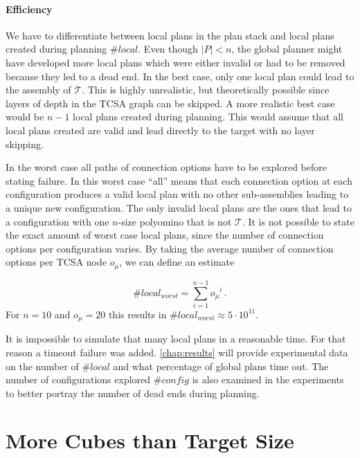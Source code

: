 \paragraph{Efficiency}

We have to differentiate between local plans in the plan stack and local plans created during planning $\#\textit{local}$.
Even though $|P| < n$, the global planner might have developed more local plans which were either invalid or had to be removed because they led to a dead end.
In the best case, only one local plan could lead to the assembly of $\mathcal{T}$.
This is highly unrealistic, but theoretically possible since layers of depth in the TCSA graph can be skipped.
A more realistic best case would be $n-1$ local plans created during planning. 
This would assume that all local plans created are valid and lead directly to the target with no layer skipping.

In the worst case all paths of connection options have to be explored before stating failure.
In this worst case ``all'' means that each connection option at each configuration produces a valid local plan with no other sub-assemblies leading to a unique new configuration.
The only invalid local plans are the ones that lead to a configuration with one $n$-size polyomino that is not $\mathcal{T}$.
It is not possible to state the exact amount of worst case local plans, since the number of connection options per configuration varies.
By taking the average number of connection options per TCSA node $o_\mu$, we can define an estimate

\begin{equation}
\#\textit{local}_\textit{worst} = \sum_{i=1}^{n-1} {o_\mu}^i \, .
\end{equation} 
For $n = 10$ and $o_\mu = 20$ this results in $\#\textit{local}_\textit{worst} \approx 5 \cdot 10^{11}$.

It is impossible to simulate that many local plans in a reasonable time.
For that reason a timeout failure was added.
\autoref{chap:results} will provide experimental data on the number of $\#\textit{local}$ and what percentage of global plans time out.
The number of configurations explored $\#\textit{config}$ is also examined in the experiments to better portray the number of dead ends during planning.


\section{More Cubes than Target Size}
\label{sec:more_cubes}

